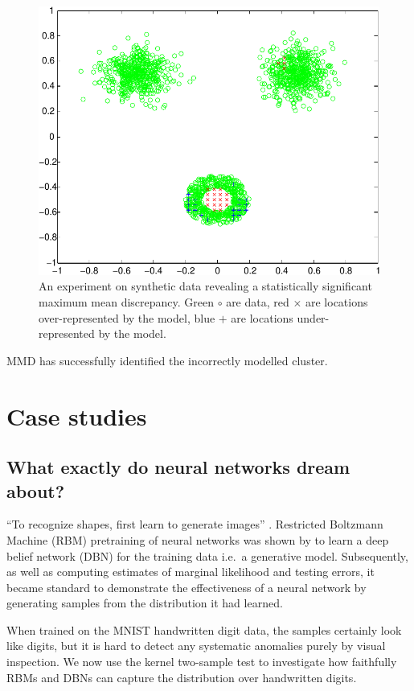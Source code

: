 \documentclass{article}
\def\ie{i.e.\ }
\begin{document}
\begin{figure}[ht]
\centering
\includegraphics[width=0.98\columnwidth]{figures/blob_blob_ring}
\caption{
An experiment on synthetic data revealing a statistically significant maximum mean discrepancy.
Green $\circ$ are data, red $\times$ are locations over-represented by the model, blue $+$ are locations under-represented by the model.
}
\label{fig:blob_blob_ring}
\end{figure}

MMD has successfully identified the incorrectly modelled cluster.

\section{Case studies}

\subsection{What exactly do neural networks dream about?}

``To recognize shapes, first learn to generate images'' \cite{Hinton2007}.
Restricted Boltzmann Machine (RBM) pretraining of neural networks was shown by \cite{Hinton2006} to learn a deep belief network (DBN) for the training data \ie a generative model.
Subsequently, as well as computing estimates of marginal likelihood and testing errors, it became standard to demonstrate the effectiveness of a neural network by generating samples from the distribution it had learned.

When trained on the MNIST handwritten digit data, the samples certainly look like digits, but it is hard to detect any systematic anomalies purely by visual inspection.
We now use the kernel two-sample test to investigate how faithfully RBMs and DBNs can capture the distribution over handwritten digits.
\end{document}

